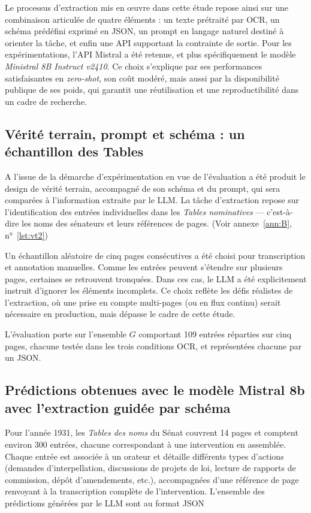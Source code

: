 Le processus d’extraction mis en œuvre dans cette étude repose ainsi sur une combinaison articulée de quatre éléments : un texte prétraité par OCR, un schéma prédéfini exprimé en JSON, un prompt en langage naturel destiné à orienter la tâche, et enfin une API supportant la contrainte de sortie. Pour les expérimentations, l’API Mistral a été retenue, et plus spécifiquement le modèle \emph{Ministral 8B Instruct v2410}. Ce choix s’explique par ses performances satisfaisantes en \emph{zero-shot}, son coût modéré, mais aussi par la disponibilité publique de ses poids, qui garantit une réutilisation et une reproductibilité dans un cadre de recherche.

\subsection{Vérité terrain, prompt et schéma : un échantillon des Tables}

A l'issue de la démarche d'expérimentation en vue de l'évaluation a été produit le design de vérité terrain, accompagné de son schéma et du prompt, qui sera comparées à l'information extraite par le LLM. La tâche d’extraction repose sur l’identification des entrées individuelles dans les \emph{Tables nominatives} — c’est-à-dire les noms des sénateurs et leurs références de pages. (Voir annexe~\ref{ann:B}, n°~\ref{lst:vt2})

Un échantillon aléatoire de cinq pages consécutives a été choisi pour transcription et annotation manuelles. Comme les entrées peuvent s’étendre sur plusieurs pages, certaines se retrouvent tronquées. Dans ces cas, le LLM a été explicitement instruit d’ignorer les éléments incomplets. Ce choix reflète les défis réalistes de l’extraction, où une prise en compte multi-pages (ou en flux continu) serait nécessaire en production, mais dépasse le cadre de cette étude.

L’évaluation porte sur l'ensemble $G$ comportant 109 entrées réparties sur cinq pages, chacune testée dans les trois conditions OCR, et représentées chacune par un JSON. 

\subsection{Prédictions obtenues avec le modèle Mistral 8b avec  l'extraction guidée par schéma}

Pour l’année 1931, les \emph{Tables des noms} du Sénat couvrent 14 pages et comptent environ 300 entrées, chacune correspondant à une intervention en assemblée. Chaque entrée est associée à un orateur et détaille différents types d’actions (demandes d’interpellation, discussions de projets de loi, lecture de rapports de commission, dépôt d’amendements, etc.), accompagnées d’une référence de page renvoyant à la transcription complète de l’intervention. L'ensemble des prédictions générées par le LLM sont au format JSON

